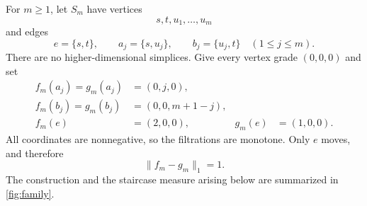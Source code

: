 \documentclass[11pt]{article}
\theoremstyle{definition}
\newcommand{\1}{\mathbf{1}}
\newcommand{\fm}{f_m}
\newcommand{\gm}{g_m}
\newcommand{\Sm}{S_m}
\begin{document}
For $m\geq1$, let $\Sm$ have vertices
\[
  s,t,u_1,\ldots,u_m
\]
and edges
\[
  e=\{s,t\},\qquad a_j=\{s,u_j\},\qquad b_j=\{u_j,t\}
  \quad(1\leq j\leq m).
\]
There are no higher-dimensional simplices.  Give every vertex grade
$(0,0,0)$ and set
\begin{align*}
  \fm(a_j)=\gm(a_j)&=(0,j,0),\\
  \fm(b_j)=\gm(b_j)&=(0,0,m+1-j),\\
  \fm(e)&=(2,0,0),&
  \gm(e)&=(1,0,0).
\end{align*}
All coordinates are nonnegative, so the filtrations are monotone.  Only $e$
moves, and therefore
\begin{equation}\label{eq:input-one}
  \lVert\fm-\gm\rVert_1=1.
\end{equation}
The construction and the staircase measure arising below are summarized in
\cref{fig:family}.
\end{document}
